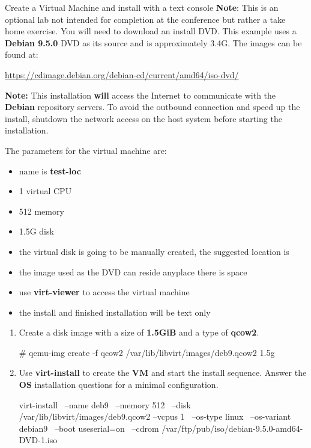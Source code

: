\begin{Lab}
\begin{exe}  {Create a Virtual Machine and install with a text console}
	\textbf{Note}: This is an optional lab not intended for completion at the
	conference but rather a take home exercise. You will need to download an install DVD.
	This example uses a \textbf{Debian 9.5.0} DVD as its source and is approximately
	3.4G. The images can be found at:

	\url{https://cdimage.debian.org/debian-cd/current/amd64/iso-dvd/}

	\textbf{Note:} This installation \textbf{will} access the Internet 
	to communicate with the \textbf{Debian} repository servers.
	To avoid the outbound connection and speed up the install,
	shutdown the network access 
	on the host system before starting the installation. 

 The parameters for the virtual machine are:
        \begin{itemize}
                \item name is \textbf{test-loc}
                \item 1 virtual CPU
                \item 512 memory
		\item 1.5G disk 
                \item the virtual disk is going to be manually created, the
			suggested location is 
		\item the image used as the DVD can reside anyplace 
			there is space
                \item use \textbf{virt-viewer} to access the virtual machine
		\item the install and finished installation will be text only
	\end{itemize}

	\begin{sol}
	\begin{enumerate}
		\item Create a disk image with a size of \textbf{1.5GiB} and a 
			type of \textbf{qcow2}. 
			\begin{raw}
# qemu-img create -f qcow2 /var/lib/libvirt/images/deb9.qcow2 1.5g
			\end{raw} 
		\item Use \textbf{virt-install} to create the
			\textbf{VM} and start the install sequence. 
			Answer the \textbf{OS} installation questions for a 
			minimal configuration. 
		\begin{raw}

 virt-install \
	--name deb9 \
	--memory 512 \
	--disk /var/lib/libvirt/images/deb9.qcow2 --vcpus 1 \
	--os-type linux \
	--os-variant debian9 \
	--boot useserial=on  \
	--cdrom /var/ftp/pub/iso/debian-9.5.0-amd64-DVD-1.iso


\end{raw}
\end{enumerate}
\end{sol}
\end{exe}
\end{Lab}
